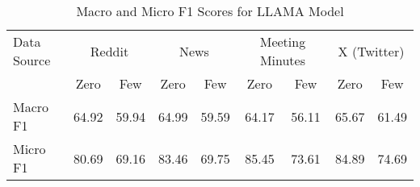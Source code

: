 \begin{table}[htbp]
\centering
\begin{tabular}{l *{8}{c}}
\toprule
Data Source & \multicolumn{2}{c}{Reddit} & \multicolumn{2}{c}{News} & \multicolumn{2}{c}{Meeting Minutes} & \multicolumn{2}{c}{X (Twitter)} \\
& Zero & Few & Zero & Few & Zero & Few & Zero & Few \\
\midrule
Macro F1 & 64.92 & 59.94 & 64.99 & 59.59 & 64.17 & 56.11 & 65.67 & 61.49 \\
Micro F1 & 80.69 & 69.16 & 83.46 & 69.75 & 85.45 & 73.61 & 84.89 & 74.69 \\
\bottomrule
\end{tabular}
\centering\caption{Macro and Micro F1 Scores for LLAMA Model}
\label{tab:llama_macro_micro}
\end{table}